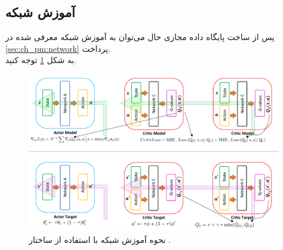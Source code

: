 \subsection{آموزش شبکه }
پس از ساخت پایگاه داده مجازی حال می‌توان به آموزش شبکه معرفی شده در \ref{sec:ch_pm:network} پرداخت.
\\
به شکل \ref{fig:ch_er:td3} توجه کنید.

\begin{figure}[!ht]
	\centering 
	\includegraphics[width=\textwidth]{img/chaps/er/td3_crop}
	\caption{نحوه آموزش شبکه با استفاده از ساختار  \cite{fujimoto2018addressing}.}    
	\label{fig:ch_er:td3}
\end{figure} 

